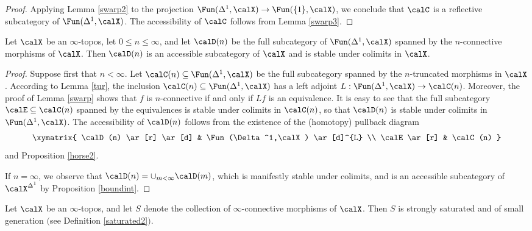 \begin{proof}
Applying Lemma \ref{swarp2} to the projection $\Fun(\Delta^1,\calX) \rightarrow \Fun( \{1\}, \calX)$, we conclude that $\calC$ is a reflective subcategory of $\Fun(\Delta^1,\calX)$. The accessibility
of $\calC$ follows from Lemma \ref{swarp3}.
\end{proof}

\begin{lemma}\label{swarp4}
Let $\calX$ be an $\infty$-topos, let $0 \leq n \leq \infty$, and let $\calD(n)$ be the full subcategory of $\Fun(\Delta^1,\calX)$ spanned by the $n$-connective morphisms of $\calX$. Then
$\calD(n)$ is an accessible subcategory of $\calX$ and is stable under colimits in 
$\calX$.
\end{lemma}

\begin{proof}
Suppose first that $n < \infty$. Let $\calC(n) \subseteq \Fun(\Delta^1,\calX)$ be the full subcategory spanned by the $n$-truncated morphisms in $\calX$. According to Lemma \ref{tur}, the
inclusion $\calC(n) \subseteq \Fun(\Delta^1,\calX)$ has a left adjoint $L: \Fun(\Delta^1,\calX) \rightarrow \calC(n)$. Moreover, the proof of Lemma \ref{swarp} shows that $f$ is $n$-connective if and only if $Lf$ is an equivalence. It is easy to see that the full subcategory $\calE \subseteq \calC(n)$ spanned by the equivalences is stable under colimits in $\calC(n)$, so that $\calD(n)$ is stable under colimits in $\Fun(\Delta^1,\calX)$. The accessibility of $\calD(n)$ follows from the existence of the (homotopy) pullback diagram
$$ \xymatrix{ \calD(n) \ar[r] \ar[d] & \Fun(\Delta^1,\calX) \ar[d]^{L} \\
\calE \ar[r] & \calC(n) }$$
and Proposition \ref{horse2}.

If $n=\infty$, we observe that $\calD(n) = \cup_{m < \infty} \calD(m)$, which is manifestly stable under colimits, and is an accessible subcategory of $\calX^{\Delta^1}$ by Proposition \ref{boundint}.
\end{proof}

\begin{proposition}\label{goober3}
Let $\calX$ be an $\infty$-topos, and let $S$ denote the
collection of $\infty$-connective morphisms of $\calX$. Then $S$ is strongly 
saturated and of small generation $($see Definition \ref{saturated2}$)$. 
\end{proposition}


